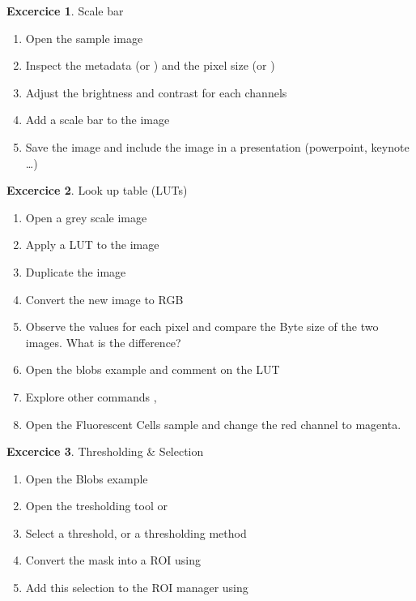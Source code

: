 \documentclass[xcolor=table]{scrartcl}
\theoremstyle{definition}
\newtheorem{exercice}{Excercice}
\begin{document}
\begin{exercice} Scale bar
  \begin{enumerate}
  \item Open the sample image  
  \item Inspect the metadata  (or ) and the pixel size  (or )
  \item Adjust the brightness and contrast for each channels
  \item Add a scale bar to the image
  \item Save the image and include the image in a presentation (powerpoint, keynote \dots)
  \end{enumerate}
\end{exercice}


\begin{exercice} Look up table (LUTs)
  \begin{enumerate}
  \item Open a grey scale image 
  \item Apply a LUT to the image 
  \item Duplicate the image 
  \item Convert the new image to RGB 
  \item Observe the values for each pixel and compare the Byte size of the two images. What is the difference?
  \item Open the blobs example  and
    comment on the LUT
  \item Explore other commands ,
  \item Open the Fluorescent Cells sample and change the red channel
    to magenta.
  \end{enumerate}
\end{exercice}

\begin{exercice} Thresholding \& Selection
  \begin{enumerate}
  \item Open the Blobs example 
  \item Open the tresholding tool  or 
  \item Select a threshold, or a thresholding method
  \item Convert the mask into a ROI using 
  \item Add this selection to the ROI manager using 
  \end{enumerate}
\end{exercice}
\end{document}
